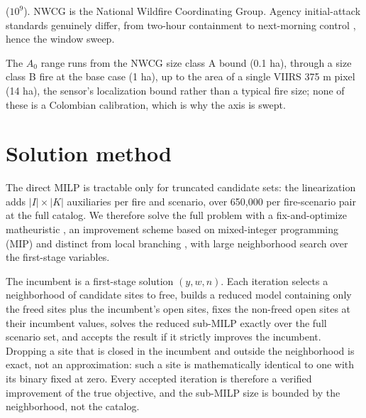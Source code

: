 \documentclass[11pt]{article}
\begin{document}
\begin{table}[!htbp]
\begin{threeparttable}
\begin{tablenotes}[flushleft]
($10^9$). NWCG is the National Wildfire Coordinating Group. Agency
initial-attack standards genuinely differ, from two-hour containment
\citep{nwcg2026} to next-morning control \citep{korkola2024}, hence
the window sweep.
\item[a] The $A_0$ range runs from the NWCG size class A bound (0.1
ha), through a size class B fire at the base case (1 ha), up to the
area of a single VIIRS 375 m pixel (14 ha), the sensor's localization
bound rather than a typical fire size; none of these is a Colombian
calibration, which is why the axis is swept.
\end{tablenotes}
\end{threeparttable}
\end{table}

\section{Solution method}
\label{sec:method}

The direct MILP is tractable only for truncated candidate sets: the
linearization adds $|I| \times |K|$ auxiliaries per fire and scenario,
over 650{,}000 per fire-scenario pair at the full catalog. We therefore
solve the full problem with a fix-and-optimize matheuristic
\citep{helber2010}, an improvement scheme based on mixed-integer
programming (MIP) and distinct from local
branching \citep{fischetti2003}, with large neighborhood search
\citep{pisinger2010} over the first-stage variables.

The incumbent is a first-stage solution $(y, w, n)$. Each iteration
selects a neighborhood of candidate sites to free, builds a reduced
model containing only the freed sites plus the incumbent's open sites,
fixes the non-freed open sites at their incumbent values, solves the
reduced sub-MILP exactly over the full scenario set, and accepts the
result if it strictly improves the incumbent. Dropping a site that is
closed in the incumbent and outside the neighborhood is exact, not an
approximation: such a site is mathematically identical to one with its
binary fixed at zero. Every accepted iteration is therefore a verified
improvement of the true objective, and the sub-MILP size is bounded by
the neighborhood, not the catalog.
\end{document}
